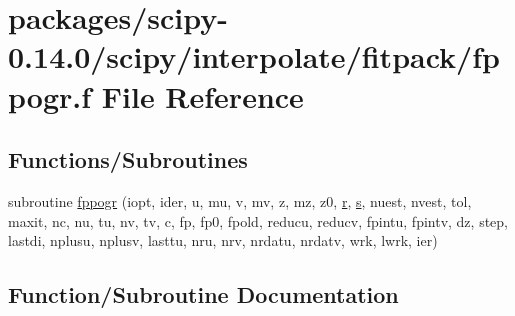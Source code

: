 \hypertarget{fppogr_8f}{}\section{packages/scipy-\/0.14.0/scipy/interpolate/fitpack/fppogr.f File Reference}
\label{fppogr_8f}
\subsection*{Functions/\+Subroutines}
\begin{DoxyCompactItemize}
\item 
subroutine \hyperlink{fppogr_8f_a5f96c0313a718d376f4fd8247e7745eb}{fppogr} (iopt, ider, u, mu, v, mv, z, mz, z0, \hyperlink{indexexpr_8h_ac434fd11cc2493608d8d91424d60c17e}{r}, \hyperlink{indexexpr_8h_ae024b0db549122b44c349ae28ec990dc}{s}, nuest, nvest, tol, maxit, nc, nu, tu, nv, tv, c, fp, fp0, fpold, reducu, reducv, fpintu, fpintv, dz, step, lastdi, nplusu, nplusv, lasttu, nru, nrv, nrdatu, nrdatv, wrk, lwrk, ier)
\end{DoxyCompactItemize}


\subsection{Function/\+Subroutine Documentation}
\hypertarget{fppogr_8f_a5f96c0313a718d376f4fd8247e7745eb}{}
